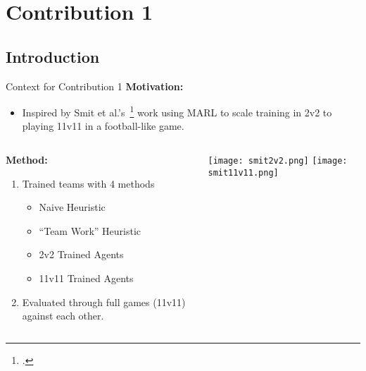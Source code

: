 \section{Contribution 1}


\subsection{Introduction}

\begin{frame}{Context for Contribution 1}
    \textbf{Motivation:}
    \begin{itemize}
        \item Inspired by Smit et al.'s~\footcite{smit2023} 
        work using MARL to scale training in 2v2 to playing 11v11 in a football-like game.
    \end{itemize}
    \begin{columns}
        \begin{column}{0.5\textwidth}
            \textbf{Method:}
            \begin{enumerate}
                \item Trained teams with 4 methods
                \begin{itemize}
                    \item Naive Heuristic
                    \item ``Team Work'' Heuristic
                    \item 2v2 Trained Agents
                    \item 11v11 Trained Agents
                \end{itemize}
                \item Evaluated through full games (11v11) against each other.
            \end{enumerate}
        \end{column}
        \begin{column}{0.5\textwidth}
            \begin{center}
                \texttt{[image: smit2v2.png]}
                \texttt{[image: smit11v11.png]}
            \end{center}
        \end{column}
    \end{columns}
\end{frame}


